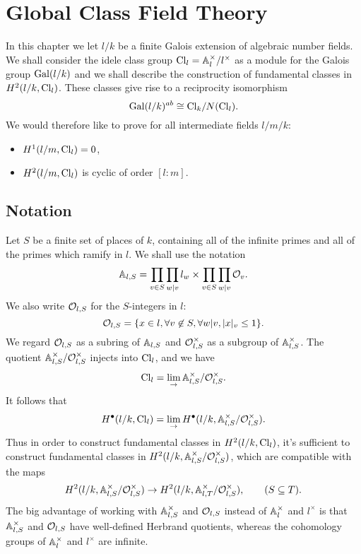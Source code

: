 \chapter{Global Class Field Theory}

In this chapter we let $l/k$ be a finite Galois extension of
algebraic number fields. We shall consider the idele class group $\mathrm{Cl}_l = {\mathbb A}_l^\times / l^\times$
as a module for the Galois group $\mathrm{Gal}(l/k)$ and we shall describe the construction of
fundamental classes in $H^2(l/k, \mathrm{Cl}_l)$.
These classes give rise to a reciprocity isomorphism
\[
	\mathrm{Gal}(l/k)^{ab} \cong \mathrm{Cl}_k / N(\mathrm{Cl}_l).
\]
We would therefore like to prove for all intermediate fields $l / m / k$:
\begin{itemize}
	\item
	$H^1(l/m, \mathrm{Cl}_l) = 0$,
	\item
	$H^2(l/m, \mathrm{Cl}_l)$ is cyclic of order $[l:m]$.
\end{itemize}


\section{Notation}

Let $S$ be a finite set of places of $k$, containing all of the infinite primes and all
of the primes which ramify in $l$.
We shall use the notation
\[
	{\mathbb A}_{l,S} = \prod_{v \in S} \prod_{w | v} l_w \times \prod_{v \in S} \prod_{w | v} {\mathcal O}_v.
\]
We also write ${\mathcal O}_{l,S}$ for the $S$-integers in $l$:
\[
	{\mathcal O}_{l,S} = \{x \in l, \forall v \not\in S, \forall w | v, |x|_v \le 1\}.
\]
We regard ${\mathcal O}_{l,S}$ as a subring of ${\mathbb A}_{l,S}$ and
${\mathcal O}_{l,S}^\times$ as a subgroup of ${\mathbb A}_{l,S}^\times$.
The quotient ${\mathbb A}_{l,S}^\times / {\mathcal O}_{l,S}^\times$ injects into $\mathrm{Cl}_l$,
and we have
\[
	\mathrm{Cl}_l = \lim_\to {\mathbb A}_{l,S}^\times / {\mathcal O}_{l,S}^\times.
\]
It follows that
\[
	H^\bullet(l/k, \mathrm{Cl}_l) = \lim_\to H^\bullet(l/k, {\mathbb A}_{l,S}^\times / {\mathcal O}_{l,S}^\times).
\]
Thus in order to construct fundamental classes in $H^2(l/k, \mathrm{Cl}_l)$, it's sufficient to
construct fundamental classes in $H^2(l/k, {\mathbb A}_{l,S}^\times / {\mathcal O}_{l,S}^\times)$,
which are compatible with the maps
\[
	H^2(l/k, {\mathbb A}_{l,S}^\times / {\mathcal O}_{l,S}^\times)
	\to
	H^2(l/k, {\mathbb A}_{l,T}^\times / {\mathcal O}_{l,S}^\times),
	\qquad
	(S \subseteq T).
\]
The big advantage of working with ${\mathbb A}_{l,S}^\times$ and ${\mathcal O}_{l,S}$ instead of ${\mathbb A}_l^\times$ and
$l^\times$ is that ${\mathbb A}_{l,S}^\times$ and ${\mathcal O}_{l,S}$ have well-defined Herbrand quotients,
whereas the cohomology groups of ${\mathbb A}_l^\times$ and $l^\times$ are infinite.



